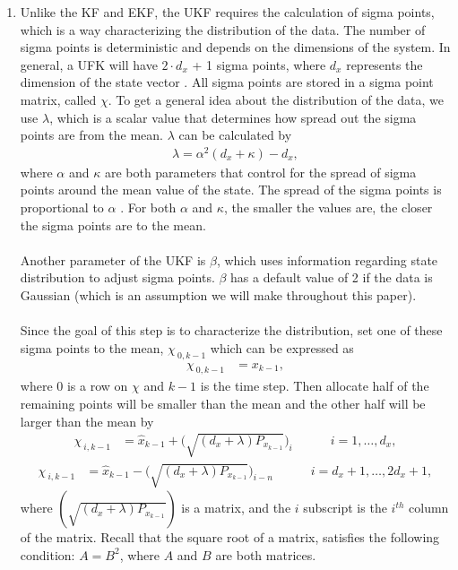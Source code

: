 \begin{enumerate}
        \item Unlike the KF and EKF, the UKF requires the calculation of sigma points, which is a way characterizing the distribution of the data. The number of sigma points is deterministic and depends on the dimensions of the system. In general, a UFK will have  $2 \cdot d_x$ + 1 sigma points, where $d_x$ represents the dimension of the state vector \cite{inbook, inproceedings, Wan01theunscented}.  All sigma points are stored in a sigma point matrix, called $\chi$. To get a general idea about the distribution of the data, we use $\lambda$, which is a scalar value that determines how spread out the sigma points are from the mean. $\lambda$ can be calculated by
         \begin{align*}
        \lambda = \alpha^{2}(d_{x}+\kappa)-d_{x},
         \end{align*}
         where  $\alpha$ and $\kappa$ are both parameters that control for the spread of sigma points around the mean value of the state. The spread of the sigma points is proportional to $\alpha$ . For both $\alpha$ and $\kappa $,  the smaller the values are, the closer the sigma points are to the mean.\\ \\
       Another parameter of the UKF is $\beta$, which uses information regarding state distribution to adjust sigma points. $\beta$ has a default value of 2 if the data is Gaussian (which is an assumption we will make throughout this paper).  \\ \\
       Since the goal of this step is to characterize the distribution, set one of these sigma points to the mean, $\chi_{\ 0,k-1}$ which can be expressed as 
    \begin{align*}
        \chi_{\ 0,k-1} &= x_{k-1} ,
     \end{align*}
     where 0 is a row on $\chi$ and $k-1$ is the time step. Then allocate half of the remaining points will be smaller than the mean and the other half will be larger than the mean by
         \begin{align*}
        \chi_{\ i,k-1} &= \hat{x}_{k-1} +  \bigg(\sqrt{(d_{x}+\lambda )P_{x_{k-1}}}\bigg)_{i} \quad \quad \quad i=1,\dots, d_x, 
        \end{align*}
         \begin{align*}
        \chi_{\ i,k-1} &= \hat{x}_{k-1} - \bigg(\sqrt{(d_{x}+\lambda )P_{x_{k-1}}}\bigg)_{i-n} \quad \quad \quad i=d_x + 1,\dots,2 d_x + 1,
        \end{align*}
        where $(\sqrt{(d_{x}+\lambda)P_{x_{k-1}}})$ is a matrix, and the $i$ subscript is the $i^{th}$ column of the matrix. 
        Recall that the square root of a matrix, satisfies the following condition: $A = B^2$, where $A$ and $B$ are both matrices. 
        

\end{enumerate}
